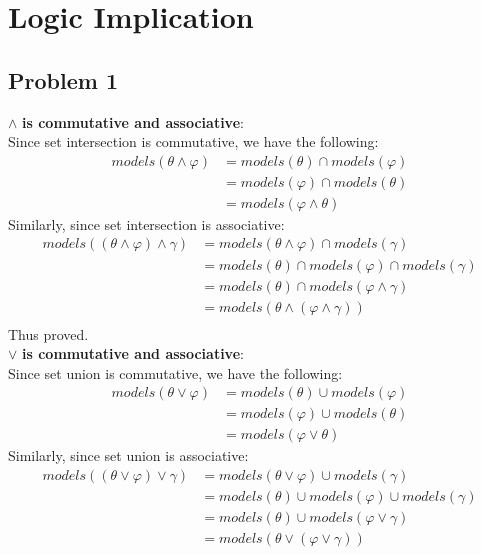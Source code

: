 \documentclass[12pt]{article}
\renewcommand{\phi}{\varphi}
\begin{document}
\section*{Logic Implication}
\subsection*{Problem 1}
$\wedge$\textbf{ is commutative and associative}:\\
Since set intersection is commutative, we have the following:\\[5pt]
\begin{align*}
models(\theta \wedge \phi)
&= models(\theta) \cap models(\phi) \\
&= models(\phi) \cap models(\theta) \\
&= models(\phi \wedge \theta)
\end{align*}
Similarly, since set intersection is associative: 
\begin{align*}
models((\theta \wedge \phi)\wedge \gamma)
&= models(\theta\wedge \phi) \cap models(\gamma) \\
&= models(\theta) \cap models(\phi) \cap models(\gamma) \\
&= models(\theta) \cap models(\phi \wedge \gamma) \\
&= models(\theta \wedge (\phi \wedge \gamma))\\
\end{align*}
Thus proved. \\[10pt]
$\vee$\textbf{ is commutative and associative}:\\
Since set union is commutative, we have the following:\\[5pt]
\begin{align*}
models(\theta \vee \phi)
&= models(\theta) \cup models(\phi) \\
&= models(\phi) \cup models(\theta) \\
&= models(\phi \vee \theta)
\end{align*}
Similarly, since set union is associative: 
\begin{align*}
models((\theta \vee \phi)\vee \gamma)
&= models(\theta\vee\phi) \cup models(\gamma) \\
&= models(\theta) \cup models(\phi) \cup models(\gamma) \\
&= models(\theta) \cup models(\phi \vee \gamma) \\
&= models(\theta \vee (\phi \vee \gamma))\\
\end{align*}
\end{document}
